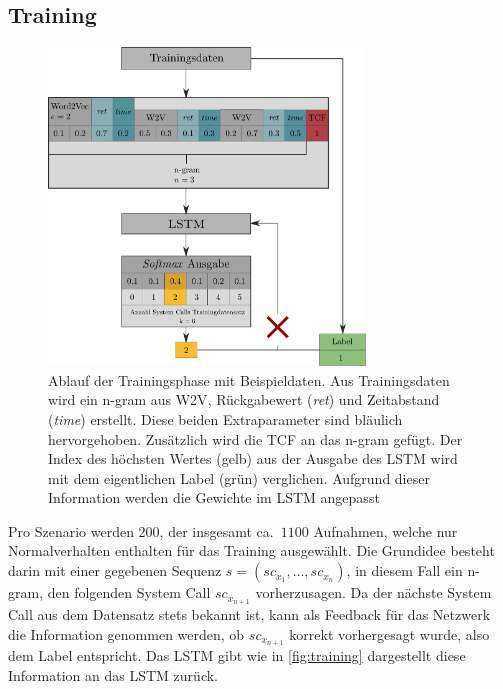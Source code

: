         \subsection{Training}\label{sec:Training}
            \begin{figure}
                \centering
                \includegraphics[width=0.75\textwidth]{images/Process_overview.pdf}
                \caption{Ablauf der Trainingsphase mit Beispieldaten.
                        Aus Trainingsdaten wird ein n-gram aus \ac{W2V}, Rückgabewert (\textit{ret}) und Zeitabstand (\textit{time}) erstellt.
                        Diese beiden Extraparameter sind bläulich hervorgehoben.
                        Zusätzlich wird die \ac{TCF} an das n-gram gefügt.
                        Der Index des höchsten Wertes (gelb) aus der Ausgabe des \ac{LSTM} wird mit dem eigentlichen Label (grün) verglichen.
                        Aufgrund dieser Information werden die Gewichte im \ac{LSTM} angepasst}\label{fig:training}
            \end{figure}
            Pro Szenario werden $200$, der insgesamt ca.\ $1100$ Aufnahmen,  welche nur Normalverhalten enthalten für das Training ausgewählt.
            Die Grundidee besteht darin mit einer gegebenen Sequenz $s = (sc_{x_1},\dots,sc_{x_n})$, in diesem Fall ein n-gram, den folgenden System Call $sc_{x_{n+1}}$ vorherzusagen. 
            Da der nächste System Call aus dem Datensatz stets bekannt ist, kann als Feedback für das Netzwerk die Information genommen werden, ob $sc_{x_{n+1}}$ korrekt vorhergesagt wurde, also dem Label entspricht.
            Das \ac{LSTM} gibt wie in \autoref{fig:training} dargestellt diese Information an das \ac{LSTM} zurück.


